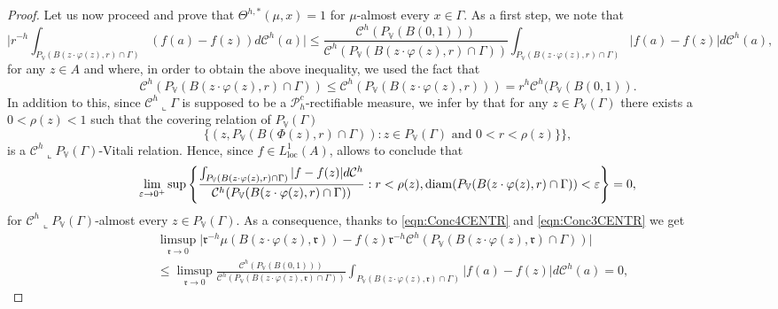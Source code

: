 \documentclass[10pt, a4paper,
oneside, headinclude,footinclude]{scrartcl}
\begin{document}
\begin{proof}
Let us now proceed and prove that $\Theta^{h,*}(\mu,x)=1$ for $\mu$-almost every $x\in \Gamma$. As a first step, we note that
\begin{equation}\label{eqn:Conc4CENTR}
    \Big|r^{-h}\int_{P_{\mathbb V}( B(z\cdot\varphi(z),r)\cap \Gamma)}(f(a)-f(z))d\mathcal{C}^h(a)\Big|\leq \frac{\mathcal{C}^h(P_{\mathbb V}(B(0,1)))}{\mathcal{C}^h(P_{\mathbb V}(B(z\cdot\varphi(z),r)\cap\Gamma))}\int_{P_{\mathbb V}(B(z\cdot\varphi(z),r)\cap\Gamma)}|f(a)-f(z)|d\mathcal{C}^h(a),
\end{equation}
for any $z\in A$ and where, in order to obtain the above inequality, we used the fact that
$$
\mathcal{C}^h(P_{\mathbb V}(B(z\cdot\varphi(z),r)\cap\Gamma))\leq \mathcal{C}^h(P_{\mathbb V}(B(z\cdot\varphi(z),r)))=r^h\mathcal{C}^h(P_{\mathbb V}(B(0,1)).
$$
In addition to this, since $\mathcal{C}^h\llcorner\Gamma$ is supposed to be a $\mathscr{P}^c_h$-rectifiable measure, we infer by \cite[Proposition 4.9]{antonelli2020rectifiable} that for any $z\in P_\mathbb{V}(\Gamma)$ there exists a $0<\rho(z)<1$ such that the covering relation of $P_\mathbb{V}(\Gamma)$
$$\{(z,P_\mathbb{V}(B(\Phi(z),r)\cap \Gamma)):z\in P_\mathbb{V}(\Gamma)\text{ and }0<r<\rho(z)\}\},$$
is a $\mathcal{C}^h\llcorner P_{\mathbb V}(\Gamma)$-Vitali relation. Hence, since $f\in L^1_{\mathrm{loc}}(A)$, \cite[Corollary 2.9.9]{Federer1996GeometricTheory} allows to conclude that 
\begin{equation}\label{eqn:Conc3CENTR}
\lim_{\varepsilon\to 0^+}\sup\left\{\frac{\int_{P_{\mathbb V}(B(z\cdot\varphi(z),r)\cap\Gamma)}|f-f(z)|d\mathcal{C}^h}{\mathcal{C}^h(P_{\mathbb V}(B(z\cdot\varphi(z),r)\cap\Gamma))}: r<\rho(z),\operatorname*{diam} (P_{\mathbb V}(B(z\cdot\varphi(z),r)\cap\Gamma))<\varepsilon \right\}=0,
\end{equation}
for $\mathcal{C}^h\llcorner P_{\mathbb V}(\Gamma)$-almost every $z\in  P_{\mathbb V}(\Gamma)$.
As a consequence, thanks to \eqref{eqn:Conc4CENTR} and \eqref{eqn:Conc3CENTR} we get
\begin{equation}\label{eqn:FINEFINE}
    \begin{split}
        &\limsup_{\mathfrak{r}\to 0}\Big\lvert \mathfrak{r}^{-h}\mu(B(z\cdot\varphi(z),\mathfrak{r}))-f(z)\mathfrak{r}^{-h}\mathcal{C}^h(P_\mathbb{V}(B(z\cdot\varphi(z),\mathfrak{r})\cap \Gamma))\Big\rvert\\
        &\leq \limsup_{\mathfrak{r}\to 0} \frac{\mathcal{C}^h(P_{\mathbb V}(B(0,1)))}{\mathcal{C}^h(P_{\mathbb V}(B(z\cdot\varphi(z),\mathfrak{r})\cap\Gamma))}\int_{P_{\mathbb V}(B(z\cdot\varphi(z),\mathfrak{r})\cap\Gamma)}|f(a)-f(z)|d\mathcal{C}^h(a)=0,

\end{split}
\end{equation}
\end{proof}
\end{document}
